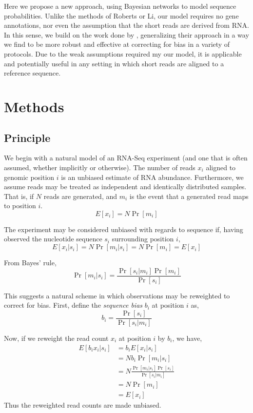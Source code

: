 \documentclass{bioinfo}
\begin{document}
Here we propose a new approach, using Bayesian networks to model sequence
probabilities. Unlike the methods of Roberts or Li, our model requires no gene
annotations, nor even the assumption that the short reads are derived from RNA.
In this sense, we build on the work done by \citet{Hansen2010}, generalizing
their approach in a way we find to be more robust and effective at correcting
for bias in a variety of protocols. Due to the weak assumptions required my our
model, it is applicable and potentially useful in any setting in which short
reads are aligned to a reference sequence.

\section{Methods}

\subsection{Principle}

We begin with a natural model of an RNA-Seq experiment (and one that is often
assumed, whether implicitly or otherwise). The number of reads $x_i$ aligned to
genomic position $i$ is an unbiased estimate of RNA abundance. Furthermore, we
assume reads may be treated as independent and identically distributed samples.
That is, if $N$ reads are generated, and $m_i$ is the event that a generated
read maps to position $i$.
$$ E[x_i] = N \Pr[m_i] $$

The experiment may be considered unbiased  with regards to sequence if, having
observed the nucleotide sequence $s_i$ surrounding position $i$,
$$ E[ x_i | s_i ] = N \Pr[ m_i | s_i ] = N \Pr[ m_i ] = E[ x_i ] $$

From Bayes' rule,
$$ \Pr[ m_i | s_i ] = \frac{ \Pr[ s_i | m_i ] \Pr[ m_i ] }{ \Pr[ s_i ] } $$

This suggests a natural scheme in which observations may be reweighted to
correct for bias.  First, define the \emph{sequence bias} $b_i$ at position $i$
as,
$$ b_i = \frac{ \Pr[ s_i ] } { \Pr[ s_i | m_i ] } $$

Now, if we reweight the read count $x_i$ at position $i$ by $b_i$, we
have,
\begin{align*}
E[ b_i x_i | s_i ] &= b_i E[ x_i | s_i ] \\
&= N b_i \Pr[ m_i | s_i ] \\
&= N \frac{ \Pr[ m_i | s_i ] \Pr[ s_i ] }{ \Pr[ s_i | m_i ] } \\
&= N \Pr[ m_i ] \\
&= E[ x_i ]
\end{align*}
Thus the reweighted read counts are made unbiased.
\end{document}
